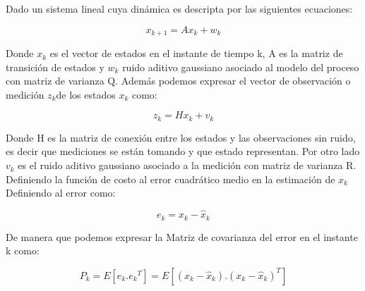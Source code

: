 \documentclass[10pt,a4paper]{article}
\begin{document}
Dado un sistema lineal cuya dinámica es descripta por las siguientes ecuaciones:\\

\begin{figure}[h!]
	\begin{center}
		\begin{equation}
		x_{k+1}= Ax_{k} + w_{k}
		\label{KF_equation01}
		\end{equation}	
	\end{center}
\end{figure}

Donde $x_{k}$ es el vector de estados en el instante de tiempo k, A es la matriz de transición de estados y $w_{k}$ ruido aditivo gaussiano asociado al modelo del proceso con matriz de varianza Q. 
Además podemos expresar el vector de observación o medición $z_{k} $de los estados $x_{k}$ como:

\begin{figure}[h!]
	\begin{center}
		\begin{equation}
		z_{k}= Hx_{k} + v_{k}
		\label{KF_equation02}
		\end{equation}	
	\end{center}
\end{figure}


Donde H es la matriz de conexión entre los estados y las observaciones sin ruido, es decir que mediciones se están tomando y que estado representan. Por otro lado $v_{k}$ es el ruido aditivo gaussiano asociado a la medición con matriz de varianza R.\\

Definiendo la función de costo al error cuadrático medio en la estimación de $x_k$ \\


Definiendo al error como: 

\begin{figure}[h!]
	\begin{center}
		\begin{equation}
		e_{k} = x_k  - \hat{x}_k
		\label{KF_error}
		\end{equation}	
	\end{center}
\end{figure}




De manera que podemos expresar la Matriz de covarianza del error en el instante k como:

\begin{figure}[h!]
	\begin{center}
		\begin{equation}
		P_{k} = E[e_k.{e_k}^{T}] = E[(x_k-\hat{x}_k).(x_k-\hat{x}_k)^{T}]
		\label{KF_equation03}
		\end{equation}	
	\end{center}
\end{figure}
\end{document}
